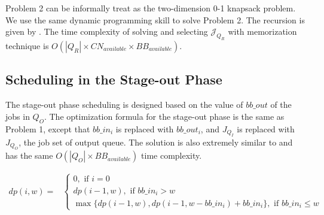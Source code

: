 Problem 2 can be informally treat as the two-dimension 0-1 knapsack problem.
We use the same dynamic programming skill to solve Problem 2.
The recursion is given by .
The time complexity of solving  and selecting $\mathcal{J}_{Q_R}$ with memorization technique is $O(|Q_R|\times CN_{available}\times BB_{available})$.


\subsection{Scheduling in the Stage-out Phase}
\label{SubSec:OptStageOut}

The stage-out phase scheduling is designed based on the value of $bb\_out$ of the jobs in $Q_O$.
The optimization formula for the stage-out phase is the same as Problem 1, 
except that $bb\_in_i$ is replaced with $bb\_out_i$, 
and $J_{Q_I}$ is replaced with $J_{Q_O}$, the job set of output queue.
The solution is also extremely similar to  and
has the same $O(|Q_O|\times BB_{available})$ time complexity.


%
%


\begin{strip}
        \begin{align}
                dp(i, w) = & 
                \left\{
                        \begin{array}{l}
                                0, \text{ if $i=0$ } \\ [0.6em]
                                dp(i-1, w), \text{ if $bb\_in_i > w$} \\ [0.6em]
                                \max \{ dp(i-1, w), dp(i-1, w-bb\_in_i) + bb\_in_i \}, \text{ if $bb\_in_i \leq w$}
                        \end{array} 
                \right.
                \label{Equ:MaxTransferDataRecursion} 
        \end{align}
\end{strip}

